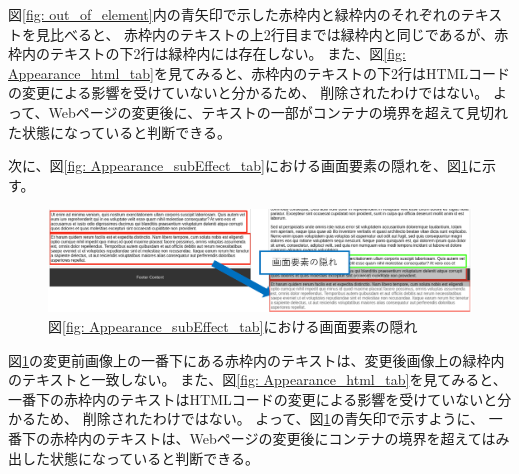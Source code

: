 図\ref{fig: out_of_element}内の青矢印で示した赤枠内と緑枠内のそれぞれのテキストを見比べると、
赤枠内のテキストの上2行目までは緑枠内と同じであるが、赤枠内のテキストの下2行は緑枠内には存在しない。
また、図\ref{fig: Appearance_html_tab}を見てみると、赤枠内のテキストの下2行はHTMLコードの変更による影響を受けていないと分かるため、
削除されたわけではない。
よって、Webページの変更後に、テキストの一部がコンテナの境界を超えて見切れた状態になっていると判断できる。
\par
次に、図\ref{fig: Appearance_subEffect_tab}における画面要素の隠れを、図\ref{fig: hidden_element}に示す。
\begin{figure}[tp]
    \begin{center}
        \includegraphics[width=1.0\columnwidth]{image/3_hidden_element2.png}
        \caption{図\ref{fig: Appearance_subEffect_tab}における画面要素の隠れ}
        \label{fig: hidden_element}
    \end{center}
\end{figure}
図\ref{fig: hidden_element}の変更前画像上の一番下にある赤枠内のテキストは、変更後画像上の緑枠内のテキストと一致しない。
また、図\ref{fig: Appearance_html_tab}を見てみると、
一番下の赤枠内のテキストはHTMLコードの変更による影響を受けていないと分かるため、
削除されたわけではない。
よって、図\ref{fig: hidden_element}の青矢印で示すように、
一番下の赤枠内のテキストは、Webページの変更後にコンテナの境界を超えてはみ出した状態になっていると判断できる。
